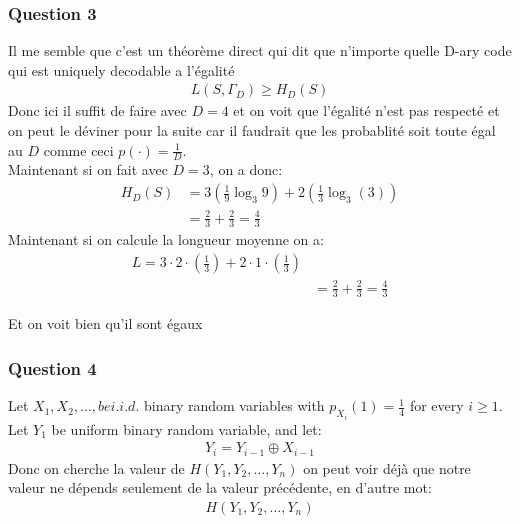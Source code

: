 \subsubsection{Question 3}
Il me semble que c'est un théorème direct qui dit que n'importe quelle D-ary code qui est uniquely decodable a l'égalité
\begin{align*} 
    L\left(S, \Gamma_D\right) \geq H_D\left(S\right)
\end{align*}
Donc ici il suffit de faire avec $D = 4$ et on voit que l'égalité n'est pas respecté et on peut le déviner pour la suite car il faudrait que les probablité soit toute égal au $D$ comme ceci $p\left(\cdot \right) =  \frac{1}{D}$.\\
Maintenant si on fait avec $D = 3$, on a donc:
\begin{align*} 
    H_D\left(S\right) &= 3 \left(\frac{1}{9} \log_3 9\right) + 2 \left(\frac{1}{3}\log_3 \left(3\right)\right)\\
    &= \frac{2}{3} + \frac{2}{3} = \frac{4}{3}
\end{align*}
Maintenant si on calcule la longueur moyenne on a:
\begin{align*} 
    L = 3\cdot 2\cdot  \left(\frac{1}{3}\right) + 2\cdot 1\cdot \left(\frac{1}{3}\right)\\
&= \frac{2}{3} + \frac{2}{3} = \frac{4}{3}
\end{align*}

Et on voit bien qu'il sont égaux


\subsubsection{Question 4}



Let $X_1, X_2, \ldots, be i.i.d.$ binary random variables with $p_{X_i} \left(1\right) =  \frac{1}{4}$ for every $i \geq 1$. Let $Y_1$ be uniform binary random variable, and let:
\begin{align*} 
    Y_i =  Y_{i-1} \oplus X_{i-1}
\end{align*}
Donc on cherche la valeur de $H\left(Y_1, Y_2, \ldots, Y_n\right)$ on peut voir déjà que notre valeur ne dépends seulement de la valeur précédente, en d'autre mot:
\begin{align*} 
    H\left(Y_1, Y_2, \ldots, Y_n\right) 
\end{align*}

